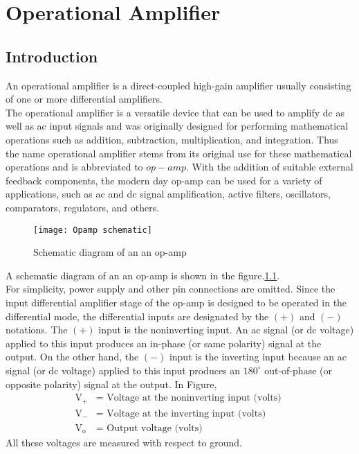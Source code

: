 \chapter{Operational Amplifier }
\section{Introduction}
An operational amplifier is a direct-coupled high-gain amplifier usually consisting of one or more differential amplifiers.\\ The operational amplifier is a versatile device that can be used to amplify dc as well as ac input signals and was originally designed for performing mathematical operations such as addition, subtraction, multiplication, and integration. Thus the name operational amplifier stems from its original use for these mathematical operations and is abbreviated to $o p-a m p$. With the addition of suitable external feedback components, the modern day op-amp can be used for a variety of applications, such as ac and dc signal amplification, active filters, oscillators, comparators, regulators, and others.

\begin{figure}[H]
	\centering
	\texttt{[image: Opamp schematic]}
	\caption{Schematic diagram of an an op-amp}
	\label{Opamp schematic}
\end{figure}
$\left. \right. $\\
 A  schematic diagram of an an op-amp is shown in the figure.\ref{Opamp schematic}. \\
  For  simplicity, power supply and other pin connections are omitted. Since the input differential amplifier stage of the op-amp is designed to be operated in the differential mode, the differential inputs are designated by the $(+)$ and $(-)$ notations. The $(+)$ input is the noninverting input. An ac signal (or dc voltage) applied to this input produces an in-phase (or same polarity) signal at the output. On the other hand, the $(-)$ input is the inverting input because an ac signal (or dc voltage) applied to this input produces an $180^{\circ}$ out-of-phase (or opposite polarity) signal at the output.
   In Figure,
   $$
   \begin{aligned}
   \mathrm{V_{+}}&=\text { Voltage at the noninverting input (volts) } \\
   \mathrm{V_{-}}&=\text { Voltage at the inverting input (volts) } \\
   \mathrm{V_{o}}&=\text { Output voltage (volts) }
   \end{aligned}
   $$
   All these voltages are measured with respect to ground.


